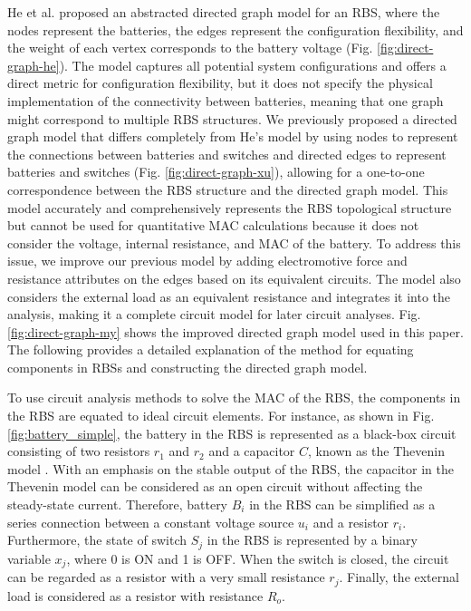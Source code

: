 \documentclass{article}
\begin{document}
He et al. \cite{heExploringAdaptiveReconfiguration2013} proposed an abstracted directed graph model for an RBS, where the nodes represent the batteries, the edges represent the configuration flexibility, and the weight of each vertex corresponds to the battery voltage (Fig. \ref{fig:direct-graph-he}). 
The model captures all potential system configurations and offers a direct metric for configuration flexibility, but it does not specify the physical implementation of the connectivity between batteries, meaning that one graph might correspond to multiple RBS structures.
We previously proposed a directed graph model that differs completely from He's model by using nodes to represent the connections between batteries and switches and directed edges to represent batteries and switches (Fig. \ref{fig:direct-graph-xu}), allowing for a one-to-one correspondence between the RBS structure and the directed graph model. 
This model accurately and comprehensively represents the RBS topological structure but cannot be used for quantitative MAC calculations because it does not consider  the voltage, internal resistance, and MAC of the battery. 
To address this issue, we improve our previous model by adding electromotive force and resistance attributes on the edges based on its equivalent circuits.
The model also considers the external load as an equivalent resistance and integrates it into the analysis, making it a complete circuit model for later circuit analyses.
Fig. \ref{fig:direct-graph-my} shows the improved directed graph model used in this paper.
The following  provides a detailed explanation of the method for equating components in RBSs and constructing the directed graph model.


To use circuit analysis methods to solve the MAC of the RBS, the components in the RBS are equated to ideal circuit elements.
For instance, as shown in Fig. \ref{fig:battery_simple}, the battery in the RBS is represented as a black-box circuit consisting of two resistors $r_1$ and $r_2$ and a capacitor $C$, known as the Thevenin model \cite{hongwenheStateofChargeEstimationLithiumIon2011,mousavig.VariousBatteryModels2014}.
With an emphasis on the stable output of the RBS, the capacitor in the Thevenin model can be considered as an open circuit without affecting the steady-state current.
Therefore,  battery $B_i$ in the RBS can be simplified as a series connection between a constant voltage source $u_{i}$ and a resistor $r_{i}$.
Furthermore, the state of switch $S_j$ in the RBS is represented by a binary variable $x_j$, where 0 is ON and 1 is OFF.
When the switch is closed, the circuit can be regarded as a resistor with a very small resistance $r_{j}$.
Finally, the external load is considered as a resistor with resistance $R_o$.
\end{document}
